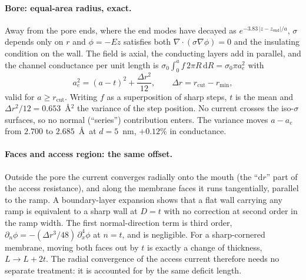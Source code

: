 \paragraph{Bore: equal-area radius, exact.}
Away from the pore ends, where the end modes have decayed as $e^{-3.83\,|z - z_\mathrm{end}|/a}$, $\sigma$ depends only on $r$ and $\phi = -Ez$ satisfies both $\nabla\!\cdot\!(\sigma\nabla\phi) = 0$ and the insulating condition on the wall. The field is axial, the conducting layers add in parallel, and the channel conductance per unit length is $\sigma_0\int_0^a f\,2\pi R\,\mathrm{d}R = \sigma_0\pi a_e^{2}$ with
\begin{equation}
a_e^{2} = (a - t)^{2} + \frac{\Delta r^{2}}{12},\qquad \Delta r = r_\mathrm{cut} - r_\mathrm{min},
\label{eq:matching}
\end{equation}
valid for $a \ge r_\mathrm{cut}$. Writing $f$ as a superposition of sharp steps, $t$ is the mean and $\Delta r^{2}/12 = 0.653$~\AA$^{2}$ the variance of the step position. No current crosses the iso-$\sigma$ surfaces, so no normal (``series'') contribution enters. The variance moves $a - a_e$ from $2.700$ to $2.685$~\AA\ at $d = 5$~nm, $+0.12\%$ in conductance.

\paragraph{Faces and access region: the same offset.}
Outside the pore the current converges radially onto the mouth (the ``$\mathrm{d}r$'' part of the access resistance), and along the membrane faces it runs tangentially, parallel to the ramp. A boundary-layer expansion shows that a flat wall carrying any ramp is equivalent to a sharp wall at $D = t$ with no correction at second order in the ramp width. The first normal-direction term is third order, $\partial_n\phi = -(\Delta r^{3}/48)\,\partial_x^{4}\phi$ at $n = t$, and is negligible. For a sharp-cornered membrane, moving both faces out by $t$ is exactly a change of thickness, $L \to L + 2t$. The radial convergence of the access current therefore needs no separate treatment: it is accounted for by the same deficit length.

